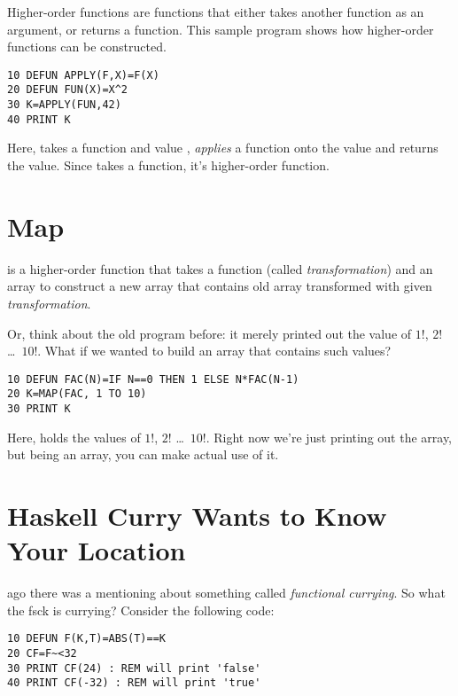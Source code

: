 Higher-order functions are functions that either takes another function as an argument, or returns a function. This sample program shows how higher-order functions can be constructed.

\begin{lstlisting}
10 DEFUN APPLY(F,X)=F(X)
20 DEFUN FUN(X)=X^2
30 K=APPLY(FUN,42)
40 PRINT K
\end{lstlisting}

Here,  takes a function  and value , \emph{applies} a function  onto the value  and returns the value. Since  takes a function, it's higher-order function.

\section[MAPping]{Map}

 is a higher-order function that takes a function (called \emph{transformation}) and an array to construct a new array that contains old array transformed with given \emph{transformation}.

Or, think about the old  program before: it merely printed out the value of $1!$, $2!$ \ldots\ $10!$. What if we wanted to build an array that contains such values?

\begin{lstlisting}
10 DEFUN FAC(N)=IF N==0 THEN 1 ELSE N*FAC(N-1)
20 K=MAP(FAC, 1 TO 10)
30 PRINT K
\end{lstlisting}

Here,  holds the values of $1!$, $2!$ \ldots\ $10!$. Right now we're just printing out the array, but being an array, you can make actual use of it.

\section[Currying]{Haskell Curry Wants to Know Your Location}
\label{currying101}

\setcounter{curryingselfref}{\value{page} - \value{curryingappearance}}

 ago there was a mentioning about something called \emph{functional currying}. So what the fsck is currying? Consider the following code:

\begin{lstlisting}
10 DEFUN F(K,T)=ABS(T)==K
20 CF=F~<32
30 PRINT CF(24) : REM will print 'false'
40 PRINT CF(-32) : REM will print 'true'
\end{lstlisting}

